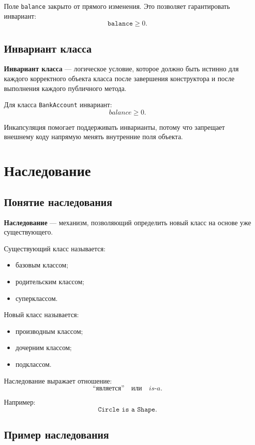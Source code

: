 \documentclass[12pt,a4paper]{article}
\begin{document}
Поле \texttt{balance} закрыто от прямого изменения. Это позволяет гарантировать инвариант:
\[
\texttt{balance} \geq 0.
\]

\subsection{Инвариант класса}

\textbf{Инвариант класса} --- логическое условие, которое должно быть истинно для каждого корректного объекта класса после завершения конструктора и после выполнения каждого публичного метода.

Для класса \texttt{BankAccount} инвариант:
\[
balance \geq 0.
\]

Инкапсуляция помогает поддерживать инварианты, потому что запрещает внешнему коду напрямую менять внутренние поля объекта.

\section{Наследование}

\subsection{Понятие наследования}

\textbf{Наследование} --- механизм, позволяющий определить новый класс на основе уже существующего.

Существующий класс называется:
\begin{itemize}
    \item базовым классом;
    \item родительским классом;
    \item суперклассом.
\end{itemize}

Новый класс называется:
\begin{itemize}
    \item производным классом;
    \item дочерним классом;
    \item подклассом.
\end{itemize}

Наследование выражает отношение:
\[
\text{``является''} \quad \text{или} \quad is\text{-}a.
\]

Например:
\[
\texttt{Circle is a Shape}.
\]

\subsection{Пример наследования}
\end{document}
